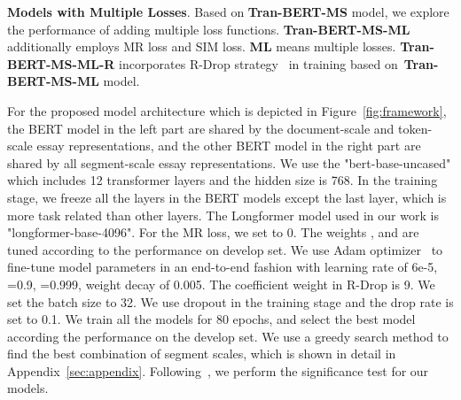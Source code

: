 \documentclass[11pt]{article}
\begin{document}
\begin{table}[h!]
\begin{center}
\end{center}
\caption{\label{font-t3} Experiment results of our model and the state-of-the-art models on ASAP long essays (WordPiece length are longer than 510). The name of our implemented model is in bold.}
\end{table}

\textbf{Models with Multiple Losses}.
Based on \textbf{Tran-BERT-MS} model, we explore the performance of adding multiple loss functions. \textbf{Tran-BERT-MS-ML} additionally employs MR loss and SIM loss.
\textbf{ML} means multiple losses.
\textbf{Tran-BERT-MS-ML-R} incorporates R-Drop strategy~\citep{Liang:2021} in training based on~\textbf{Tran-BERT-MS-ML} model. 
 




For the proposed model architecture which is depicted in Figure~\ref{fig:framework}, the BERT model in the left part are shared by the document-scale and token-scale essay representations,
and the other BERT model in the right part are shared by all segment-scale essay representations.
We use the "bert-base-uncased" which includes 12 transformer layers and the hidden size is 768.
In the training stage, we freeze all the layers in the BERT models except the last layer, which is more task related than other layers.
The Longformer model used in our work is "longformer-base-4096".
For the MR loss, we set  to 0.
The weights ,  and  are tuned according to the performance on develop set.
We use Adam optimizer~\citep{Kingma:2015} to fine-tune model parameters in an end-to-end fashion with learning rate of 6e-5, =0.9, =0.999,  weight decay of 0.005.
The coefficient weight  in R-Drop is 9.
We set the batch size to 32.
We use dropout in the training stage and the drop rate is set to 0.1.
We train all the models for 80 epochs, and select the best model according the performance on the develop set.
We use a greedy search method to find the best combination of segment scales, which is shown in detail in Appendix~\ref{sec:appendix}.
Following~\citep{Cao:2020}, we perform the significance test for our models.
\end{document}
